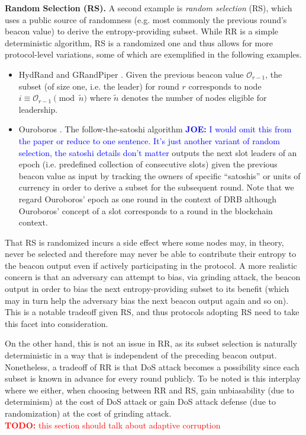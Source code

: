\documentclass[letterpaper,twocolumn,10pt]{article}
\theoremstyle{definition}
\theoremstyle{remark}
\newcommand{\todo}[1]{\textcolor{red}{\textbf{TODO:} #1}}
\newcommand{\joenote}[1]{\textcolor{blue}{\textbf{JOE:} #1}}
\begin{document}
\noindent\textbf{Random Selection (RS).} A second example is \textit{random selection} (RS), which uses a public source of randomness (e.g. most commonly the previous round's beacon value) to derive the entropy-providing subset. While RR is a simple deterministic algorithm, RS is a randomized one and thus allows for more protocol-level variations, some of which are exemplified in the following examples.
\begin{itemize}
\item HydRand \cite{schindler2020hydrand} and GRandPiper \cite{bhat2020randpiper}. Given the previous beacon value $\mathcal{O}_{r - 1}$, the subset (of size one, i.e. the leader) for round $r$ corresponds to node $i \equiv \mathcal{O}_{r - 1} \pmod{\tilde{n}}$ where $\tilde{n}$ denotes the number of nodes eligible for leadership.
\item Ouroboros \cite{kiayias2017ouroboros}. The follow-the-satoshi algorithm \cite{bentov2014proof,kiayias2017ouroboros}\joenote{I would omit this from the paper or reduce to one sentence. It's just another variant of random selection, the satoshi details don't matter} outputs the next slot leaders of an epoch (i.e. predefined collection of consecutive slots) given the previous beacon value as input by tracking the owners of specific ``satoshis'' or units of currency in order to derive a subset for the subsequent round. Note that we regard Ouroboros' epoch as one round in the context of DRB although Ouroboros' concept of a slot corresponds to a round in the blockchain context.
\end{itemize}

That RS is randomized incurs a side effect where some nodes may, in theory, never be selected and therefore may never be able to contribute their entropy to the beacon output even if actively participating in the protocol. A more realistic concern is that an adversary can attempt to bias, via grinding attack, the beacon output in order to bias the next entropy-providing subset to its benefit (which may in turn help the adversary bias the next beacon output again and so on). This is a notable tradeoff given RS, and thus protocols adopting RS need to take this facet into consideration.

On the other hand, this is not an issue in RR, as its subset selection is naturally deterministic in a way that is independent of the preceding beacon output. Nonetheless, a tradeoff of RR is that DoS attack becomes a possibility since each subset is known in advance for every round publicly. To be noted is this interplay where we either, when choosing between RR and RS, gain unbiasability (due to determinism) at the cost of DoS attack or gain DoS attack defense (due to randomization) at the cost of grinding attack.\\\todo{this section should talk about adaptive corruption}
\end{document}
